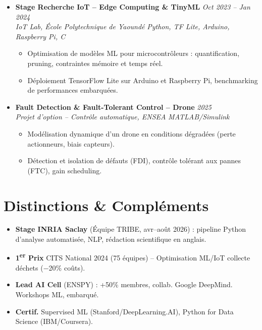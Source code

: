 \documentclass[a4paper,11pt]{article}
\begin{document}
\begin{itemize}[leftmargin=*, label={-}]
\item \textbf{Stage Recherche IoT -- Edge Computing \& TinyML} \hfill \textit{Oct 2023 -- Jan 2024} \\
\textit{IoT Lab, École Polytechnique de Yaoundé} \hfill \textit{Python, TF Lite, Arduino, Raspberry Pi, C}
\vspace{-2pt}
    \begin{itemize}[leftmargin=0.4cm, nosep, label=\tiny$\bullet$]
        \item \small{Optimisation de modèles ML pour microcontrôleurs : quantification, pruning, contraintes mémoire et temps réel.}
        \item \small{Déploiement TensorFlow Lite sur Arduino et Raspberry Pi, benchmarking de performances embarquées.}
    \end{itemize}
\vspace{3pt}

\item \textbf{Fault Detection \& Fault-Tolerant Control -- Drone} \hfill \textit{2025} \\
\textit{Projet d'option -- Contrôle automatique, ENSEA} \hfill \textit{MATLAB/Simulink}
\vspace{-2pt}
    \begin{itemize}[leftmargin=0.4cm, nosep, label=\tiny$\bullet$]
        \item \small{Modélisation dynamique d'un drone en conditions dégradées (perte actionneurs, biais capteurs).}
        \item \small{Détection et isolation de défauts (FDI), contrôle tolérant aux pannes (FTC), gain scheduling.}
    \end{itemize}
\vspace{3pt}

\end{itemize}

\section{Distinctions \& Compléments}
\begin{itemize}[leftmargin=*, label=\tiny$\bullet$, nosep]
    \item \small{\textbf{Stage INRIA Saclay} (Équipe TRIBE, avr--août 2026) : pipeline Python d'analyse automatisée, NLP, rédaction scientifique en anglais.}
    \item \small{\textbf{1\textsuperscript{er} Prix} CITS National 2024 (75 équipes) -- Optimisation ML/IoT collecte déchets ($-$20\% coûts).}
    \item \small{\textbf{Lead AI Cell} (ENSPY) : +50\% membres, collab. Google DeepMind. Workshops ML, embarqué.}
    \item \small{\textbf{Certif.} Supervised ML (Stanford/DeepLearning.AI), Python for Data Science (IBM/Coursera).}
\end{itemize}
\end{document}
